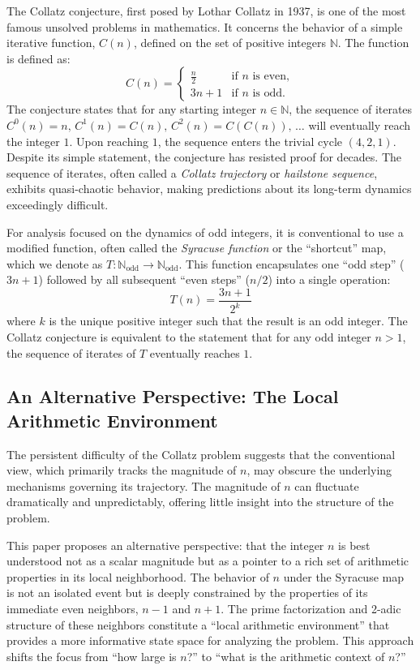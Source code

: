 \documentclass[12pt]{article}
\theoremstyle{plain}
\theoremstyle{definition}
\begin{document}
The Collatz conjecture, first posed by Lothar Collatz in 1937, is one of the most famous unsolved problems in mathematics. It concerns the behavior of a simple iterative function, $C(n)$, defined on the set of positive integers $\mathbb{N}$. The function is defined as:
\[
C(n) = 
\begin{cases}
\frac{n}{2} & \text{if } n \text{ is even}, \\
3n+1        & \text{if } n \text{ is odd}.
\end{cases}
\]
The conjecture states that for any starting integer $n \in \mathbb{N}$, the sequence of iterates $C^0(n) = n,\, C^1(n) = C(n),\, C^2(n) = C(C(n)),\, \ldots$ will eventually reach the integer $1$. Upon reaching $1$, the sequence enters the trivial cycle $(4, 2, 1)$. Despite its simple statement, the conjecture has resisted proof for decades. The sequence of iterates, often called a \emph{Collatz trajectory} or \emph{hailstone sequence}, exhibits quasi-chaotic behavior, making predictions about its long-term dynamics exceedingly difficult.

For analysis focused on the dynamics of odd integers, it is conventional to use a modified function, often called the \emph{Syracuse function} or the ``shortcut'' map, which we denote as $T\colon \mathbb{N}_{\text{odd}} \to \mathbb{N}_{\text{odd}}$. This function encapsulates one ``odd step'' ($3n+1$) followed by all subsequent ``even steps'' ($n/2$) into a single operation:
\[
T(n) = \frac{3n+1}{2^k}
\]
where $k$ is the unique positive integer such that the result is an odd integer. The Collatz conjecture is equivalent to the statement that for any odd integer $n > 1$, the sequence of iterates of $T$ eventually reaches $1$.

\subsection{An Alternative Perspective: The Local Arithmetic Environment}

The persistent difficulty of the Collatz problem suggests that the conventional view, which primarily tracks the magnitude of $n$, may obscure the underlying mechanisms governing its trajectory. The magnitude of $n$ can fluctuate dramatically and unpredictably, offering little insight into the structure of the problem.

This paper proposes an alternative perspective: that the integer $n$ is best understood not as a scalar magnitude but as a pointer to a rich set of arithmetic properties in its local neighborhood. The behavior of $n$ under the Syracuse map is not an isolated event but is deeply constrained by the properties of its immediate even neighbors, $n-1$ and $n+1$. The prime factorization and 2-adic structure of these neighbors constitute a ``local arithmetic environment'' that provides a more informative state space for analyzing the problem. This approach shifts the focus from ``how large is $n$?'' to ``what is the arithmetic context of $n$?''
\end{document}
